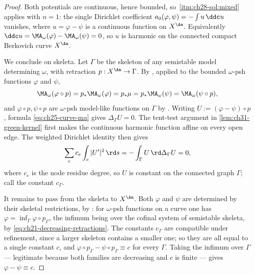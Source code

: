 \begin{proof}
Both potentials are continuous, hence bounded, so
\,\cref{itm:ch28-sol:mixed} applies with
\(n=1\): the single Dirichlet coefficient
\(a_0(\varphi,\psi)=-\int u\,\ddc u\) vanishes, where \(u=\varphi-\psi\) is
a continuous function on \(X^{\An}\).  Equivalently
\(\ddc u=\MA_\omega(\varphi)-\MA_\omega(\psi)=0\), so \(u\) is harmonic on
the connected compact Berkovich curve \(X^{\An}\).

We conclude on skeleta.  Let \(\Gamma\) be the skeleton of any semistable
model determining \(\omega\), with retraction \(p:X^{\An}\to\Gamma\).  By
, applied to the bounded \(\omega\)-psh
functions \(\varphi\) and \(\psi\),
\[
 \MA_\omega(\varphi\circ p)=p_*\MA_\omega(\varphi)=p_*\mu
 =p_*\MA_\omega(\psi)=\MA_\omega(\psi\circ p),
\]
and \(\varphi\circ p,\psi\circ p\) are \(\omega\)-psh model-like functions on
\(\Gamma\) by .  Writing
\(U:=(\varphi-\psi)\circ p\), formula \eqref{eq:ch25-curve-ma} gives
\(\Delta_\Gamma U=0\).  The tent-test argument in
\cref{lem:ch31-green-kernel} first makes the continuous harmonic function
affine on every open edge.  The weighted Dirichlet identity then gives
\[
 \sum_e c_e\int_e|U'|^2\,\rd s
       =-\int_\Gamma U\,\rd\Delta_\Gamma U=0 ,
\]
where \(c_e\) is the node residue degree,
so \(U\) is constant on the connected graph \(\Gamma\); call the constant
\(c_\Gamma\).

It remains to pass from the skeleta to \(X^{\An}\).  Both \(\varphi\) and
\(\psi\) are determined by their skeletal restrictions, by
: for \(\omega\)-psh functions on a
curve one has \(\varphi=\inf_\Gamma\varphi\circ p_\Gamma\), the infimum being
over the cofinal system of semistable skeleta, by
\eqref{eq:ch21-decreasing-retractions}.  The constants \(c_\Gamma\) are
compatible under refinement, since a larger skeleton contains a smaller one;
so they are all equal to a single constant \(c\), and
\(\varphi\circ p_\Gamma-\psi\circ p_\Gamma\equiv c\) for every \(\Gamma\).
Taking the infimum over \(\Gamma\) --- legitimate because both families are
decreasing and \(c\) is finite --- gives \(\varphi-\psi\equiv c\).
\end{proof}

